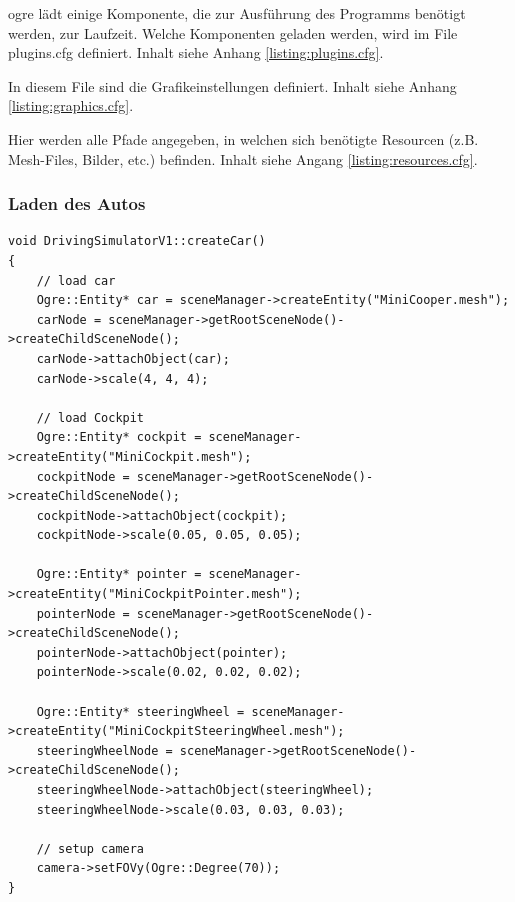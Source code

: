 \gls{ogre} lädt einige Komponente, die zur Ausführung des Programms benötigt werden, zur Laufzeit. Welche Komponenten geladen werden, wird im File plugins.cfg definiert. Inhalt siehe Anhang \ref{listing:plugins.cfg}.

In diesem File sind die Grafikeinstellungen definiert. Inhalt siehe Anhang \ref{listing:graphics.cfg}.

Hier werden alle Pfade angegeben, in welchen sich benötigte Resourcen (z.B. Mesh-Files, Bilder, etc.) befinden. Inhalt siehe Angang \ref{listing:resources.cfg}.

\subsubsection{Laden des Autos}


\begin{lstlisting}[caption={Laden des Autos},label={laden_auto}]
void DrivingSimulatorV1::createCar()
{
	// load car
	Ogre::Entity* car = sceneManager->createEntity("MiniCooper.mesh");
	carNode = sceneManager->getRootSceneNode()->createChildSceneNode();
	carNode->attachObject(car);
	carNode->scale(4, 4, 4);

	// load Cockpit
	Ogre::Entity* cockpit = sceneManager->createEntity("MiniCockpit.mesh");
	cockpitNode = sceneManager->getRootSceneNode()->createChildSceneNode();
	cockpitNode->attachObject(cockpit);
	cockpitNode->scale(0.05, 0.05, 0.05);

	Ogre::Entity* pointer = sceneManager->createEntity("MiniCockpitPointer.mesh");
	pointerNode = sceneManager->getRootSceneNode()->createChildSceneNode();
	pointerNode->attachObject(pointer);
	pointerNode->scale(0.02, 0.02, 0.02);

	Ogre::Entity* steeringWheel = sceneManager->createEntity("MiniCockpitSteeringWheel.mesh");
	steeringWheelNode = sceneManager->getRootSceneNode()->createChildSceneNode();
	steeringWheelNode->attachObject(steeringWheel);
	steeringWheelNode->scale(0.03, 0.03, 0.03);

	// setup camera
	camera->setFOVy(Ogre::Degree(70));
}
\end{lstlisting}




